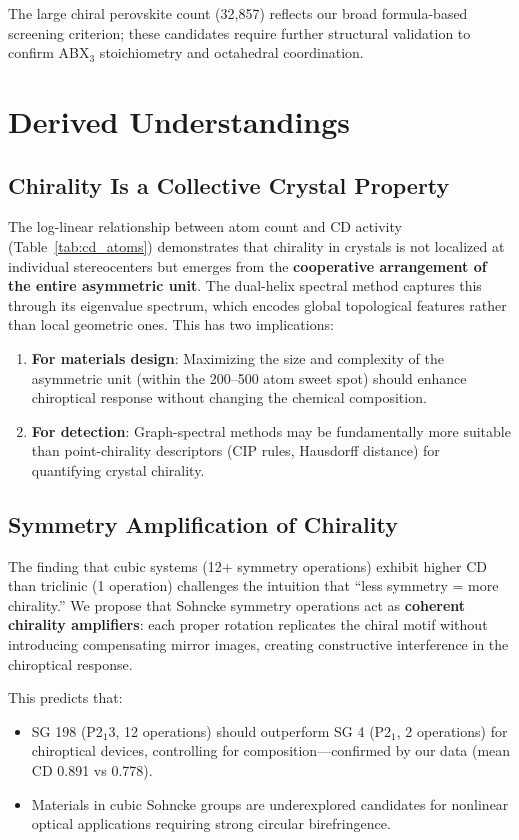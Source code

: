 \documentclass[11pt,a4paper]{article}
\begin{document}
The large chiral perovskite count (32,857) reflects our broad formula-based screening criterion; these candidates require further structural validation to confirm ABX$_3$ stoichiometry and octahedral coordination.

\section{Derived Understandings}

\subsection{Chirality Is a Collective Crystal Property}

The log-linear relationship between atom count and CD activity (Table~\ref{tab:cd_atoms}) demonstrates that chirality in crystals is not localized at individual stereocenters but emerges from the \textbf{cooperative arrangement of the entire asymmetric unit}. The dual-helix spectral method captures this through its eigenvalue spectrum, which encodes global topological features rather than local geometric ones. This has two implications:

\begin{enumerate}
\item \textbf{For materials design}: Maximizing the size and complexity of the asymmetric unit (within the 200--500 atom sweet spot) should enhance chiroptical response without changing the chemical composition.
\item \textbf{For detection}: Graph-spectral methods may be fundamentally more suitable than point-chirality descriptors (CIP rules, Hausdorff distance) for quantifying crystal chirality.
\end{enumerate}

\subsection{Symmetry Amplification of Chirality}

The finding that cubic systems (12+ symmetry operations) exhibit higher CD than triclinic (1 operation) challenges the intuition that ``less symmetry = more chirality.'' We propose that Sohncke symmetry operations act as \textbf{coherent chirality amplifiers}: each proper rotation replicates the chiral motif without introducing compensating mirror images, creating constructive interference in the chiroptical response.

This predicts that:
\begin{itemize}[nosep]
\item SG 198 (P2$_1$3, 12 operations) should outperform SG 4 (P2$_1$, 2 operations) for chiroptical devices, controlling for composition---confirmed by our data (mean CD 0.891 vs 0.778).
\item Materials in cubic Sohncke groups are underexplored candidates for nonlinear optical applications requiring strong circular birefringence.
\end{itemize}
\end{document}
